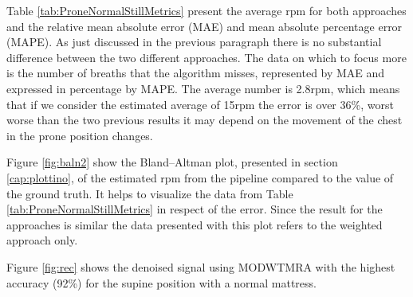 \vspace{1.3cm}
%


\vspace{0.5cm}

Table \ref{tab:ProneNormalStillMetrics} present the average rpm for both approaches  
and the relative mean absolute error (MAE) and mean absolute percentage error (MAPE). As just discussed in the previous paragraph there is no substantial difference between the two different approaches. The data on which to focus more is the number of breaths that the algorithm misses, represented by MAE and expressed in percentage by MAPE. The average number is 2.8rpm, which means that if we consider the estimated average of 15rpm the error is over 36\%, worst worse than the two previous results it may depend on the movement of the chest in the prone position changes.


\vspace{1cm}

\vspace{0.5cm}

Figure \ref{fig:baln2} show the Bland–Altman plot, presented in section \ref{cap:plottino}, of the estimated rpm from the pipeline compared to the value of the ground truth. It helps to visualize the data from Table \ref{tab:ProneNormalStillMetrics} in respect of the error. Since the result for the approaches is similar the data presented with this plot refers to the weighted approach only.

Figure \ref{fig:rec} shows the denoised signal using MODWTMRA with the highest accuracy (92\%) for the supine position with a normal mattress.

